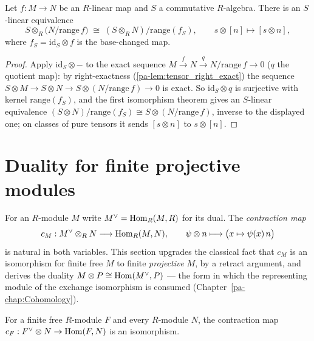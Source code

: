 \begin{theorem}
  \label{pa-thm:quot_range_baseChange}
  \leanok

  Let \(f : M \to N\) be an \(R\)-linear map and \(S\) a commutative \(R\)-algebra.
  There is an \(S\)-linear equivalence
  \[
    S \otimes_R \bigl(N/\mathrm{range}\, f\bigr) \;\cong\;
      (S \otimes_R N)\big/\mathrm{range}(f_S), \qquad
    s \otimes [n] \longmapsto [s \otimes n],
  \]
  where \(f_S = \mathrm{id}_S \otimes f\) is the base-changed map.
\end{theorem}
\begin{proof}
  \leanok
  Apply \(\mathrm{id}_S \otimes -\) to the exact sequence
  \(M \xrightarrow{f} N \xrightarrow{q} N/\mathrm{range}\, f \to 0\) (\(q\) the quotient
  map): by right-exactness (\ref{pa-lem:tensor_right_exact}) the sequence
  \(S \otimes M \to S \otimes N \to S \otimes (N/\mathrm{range}\, f) \to 0\) is exact.
  So \(\mathrm{id}_S \otimes q\) is surjective with kernel \(\mathrm{range}(f_S)\), and
  the first isomorphism theorem gives an \(S\)-linear equivalence
  \((S \otimes N)/\mathrm{range}(f_S) \cong S \otimes (N/\mathrm{range}\, f)\), inverse
  to the displayed one; on classes of pure tensors it sends \([s \otimes n]\) to
  \(s \otimes [n]\).
\end{proof}

\section{Duality for finite projective modules}
\label{pa-sec:finite_projective_duality}

For an \(R\)-module \(M\) write \(M^{\vee} = \operatorname{Hom}_R(M, R)\) for its dual. The
\emph{contraction map}
\[
  c_M : M^{\vee} \otimes_R N \longrightarrow \operatorname{Hom}_R(M, N), \qquad
  \psi \otimes n \longmapsto \bigl(x \mapsto \psi(x)\, n\bigr)
\]
is natural in both variables. This section upgrades the classical fact that \(c_M\) is
an isomorphism for finite free \(M\) to finite \emph{projective} \(M\), by a retract
argument, and derives the duality \(M \otimes P \cong \operatorname{Hom}(M^{\vee}, P)\) --- the form
in which the representing module of the exchange isomorphism is consumed
(Chapter~\ref{pa-chap:Cohomology}).

\begin{lemma}
  \label{pa-lem:dualTensorHomEquiv_free}
  \mathlibok

  For a finite free \(R\)-module \(F\) and every \(R\)-module \(N\), the contraction
  map \(c_F : F^{\vee} \otimes N \to \operatorname{Hom}(F, N)\) is an isomorphism.
\end{lemma}

